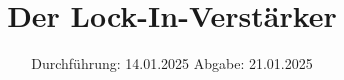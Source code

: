 

\subject{V303}
\title{Der Lock-In-Verstärker}
\date{%
  Durchführung: 14.01.2025
  \hspace{3em}
  Abgabe: 21.01.2025
}



\maketitle
\thispagestyle{empty}
\tableofcontents
\newpage






\printbibliography{}


